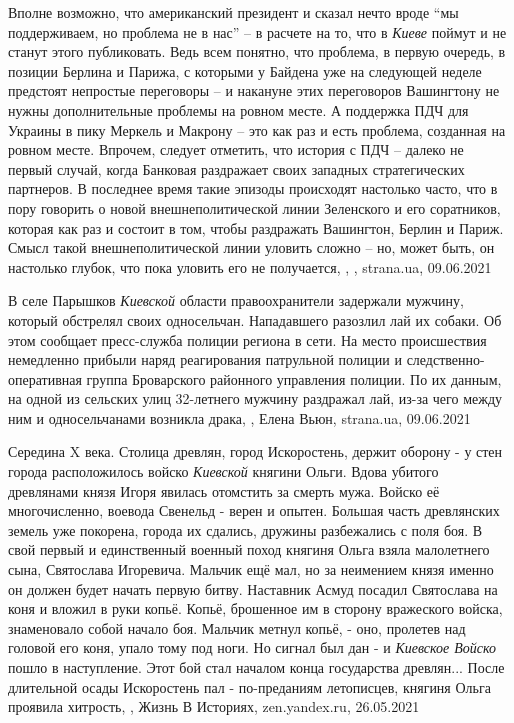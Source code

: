 Вполне возможно, что американский президент и сказал нечто вроде \enquote{мы
поддерживаем, но проблема не в нас} – в расчете на то, что в \emph{Киеве}
поймут и не станут этого публиковать. Ведь всем понятно, что проблема, в первую
очередь, в позиции Берлина и Парижа, с которыми у Байдена уже на следующей
неделе предстоят непростые переговоры – и накануне этих переговоров Вашингтону
не нужны дополнительные проблемы на ровном месте. А поддержка ПДЧ для Украины в
пику Меркель и Макрону – это как раз и есть проблема, созданная на ровном
месте.  Впрочем, следует отметить, что история с ПДЧ – далеко не первый случай,
когда Банковая раздражает своих западных стратегических партнеров. В последнее
время такие эпизоды происходят настолько часто, что в пору говорить о новой
внешнеполитической линии Зеленского и его соратников, которая как раз и состоит
в том, чтобы раздражать Вашингтон, Берлин и Париж. Смысл такой
внешнеполитической линии уловить сложно – но, может быть, он настолько глубок,
что пока уловить его не получается,
, , strana.ua, 09.06.2021

В селе Парышков \emph{Киевской} области правоохранители задержали мужчину, который
обстрелял своих односельчан. Нападавшего разозлил лай их собаки.  Об этом
сообщает пресс-служба полиции региона в сети.  На место происшествия немедленно
прибыли наряд реагирования патрульной полиции и следственно-оперативная группа
Броварского районного управления полиции.  По их данным, на одной из сельских
улиц 32-летнего мужчину раздражал лай, из-за чего между ним и односельчанами
возникла драка,
, Елена Вьюн, strana.ua, 09.06.2021

Середина X века. Столица древлян, город Искоростень, держит оборону - у стен
города расположилось войско \emph{Киевской} княгини Ольги. Вдова убитого
древлянами князя Игоря явилась отомстить за смерть мужа. Войско её
многочисленно, воевода Свенельд - верен и опытен. Большая часть древлянских
земель уже покорена, города их сдались, дружины разбежались с поля боя. В свой
первый и единственный военный поход княгиня Ольга взяла малолетнего сына,
Святослава Игоревича.  Мальчик ещё мал, но за неимением князя именно он должен
будет начать первую битву. Наставник Асмуд посадил Святослава на коня и вложил
в руки копьё. Копьё, брошенное им в сторону вражеского войска, знаменовало
собой начало боя. Мальчик метнул копьё, - оно, пролетев над головой его коня,
упало тому под ноги. Но сигнал был дан - и \emph{Киевское Войско} пошло в наступление.
Этот бой стал началом конца государства древлян... После длительной осады
Искоростень пал - по-преданиям летописцев, княгиня Ольга проявила хитрость,
, Жизнь В Историях, zen.yandex.ru, 26.05.2021

